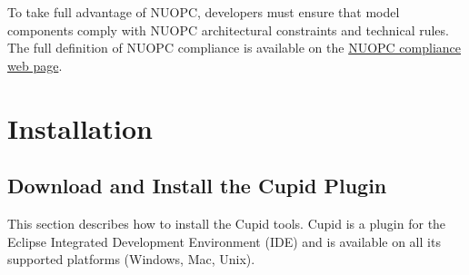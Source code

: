 \documentclass[oneside,11pt]{memoir}
\begin{document}
To take full advantage of NUOPC, developers must ensure that model components comply with NUOPC architectural constraints and technical rules. The full definition of NUOPC compliance is available on the \href{http://earthsystemcog.org/projects/nuopc/esmf2nuopc}{NUOPC compliance web page}. 


\chapter{Installation}

\section{Download and Install the Cupid Plugin}

This section describes how to install the Cupid tools. Cupid is a plugin for the Eclipse Integrated Development Environment (IDE) and is available on all its supported platforms (Windows, Mac, Unix). 
\end{document}
